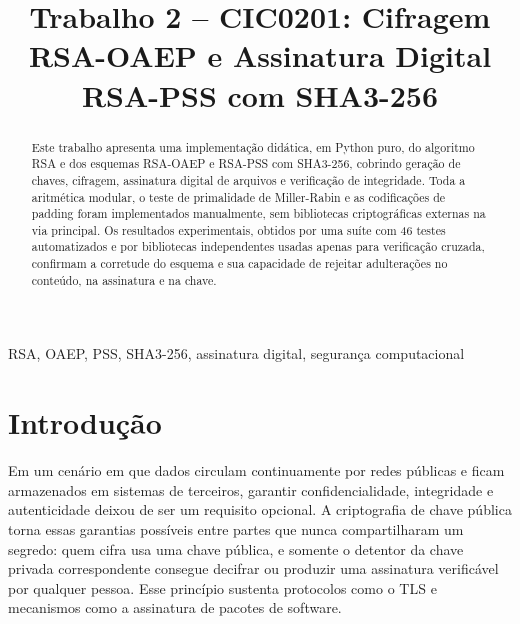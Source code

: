 \documentclass[conference]{IEEEtran}
\begin{document}
\title{Trabalho 2 -- CIC0201: Cifragem RSA-OAEP e Assinatura Digital RSA-PSS com SHA3-256}

\author{
\and
{}
\and
{}
\and
{}
}

\maketitle

\begin{abstract}
Este trabalho apresenta uma implementação didática, em Python puro, do algoritmo RSA e dos
esquemas RSA-OAEP e RSA-PSS com SHA3-256, cobrindo geração de chaves, cifragem, assinatura
digital de arquivos e verificação de integridade. Toda a aritmética modular, o teste de
primalidade de Miller-Rabin e as codificações de padding foram implementados manualmente,
sem bibliotecas criptográficas externas na via principal. Os resultados experimentais,
obtidos por uma suíte com 46 testes automatizados e por bibliotecas independentes usadas
apenas para verificação cruzada, confirmam a corretude do esquema e sua capacidade de
rejeitar adulterações no conteúdo, na assinatura e na chave.
\end{abstract}

\begin{IEEEkeywords}
RSA, OAEP, PSS, SHA3-256, assinatura digital, segurança computacional
\end{IEEEkeywords}

\section{Introdução}

Em um cenário em que dados circulam continuamente por redes públicas e ficam armazenados em
sistemas de terceiros, garantir confidencialidade, integridade e autenticidade deixou de ser
um requisito opcional. A criptografia de chave pública torna essas garantias possíveis entre
partes que nunca compartilharam um segredo: quem cifra usa uma chave pública, e somente o
detentor da chave privada correspondente consegue decifrar ou produzir uma assinatura
verificável por qualquer pessoa. Esse princípio sustenta protocolos como o TLS e mecanismos
como a assinatura de pacotes de software.
\end{document}
